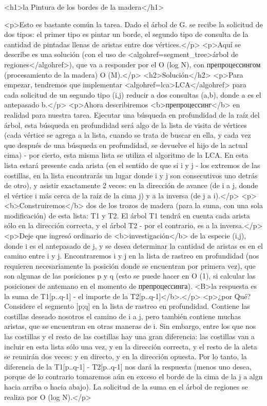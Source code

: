 <h1>la Pintura de los bordes de la madera</h1>

<p>Esto es bastante común la tarea. Dado el árbol de G. se recibe la solicitud de dos tipos: el primer tipo es pintar un borde, el segundo tipo de consulta de la cantidad de pintadas llenas de aristas entre dos vértices.</p>
<p>Aquí se describe es una solución (con el uso de <algohref=segment_tree>árbol de regiones</algohref>), que va a responder por el O (log N), con препроцессингом (procesamiento de la madera) O (M).</p>
<h2>Solución</h2>
<p>Para empezar, tendremos que implementar <algohref=lca>LCA</algohref> para cada solicitud de un segundo tipo (i,j) reducir a dos consultas (a,b), donde a es el antepasado b.</p>
<p>Ahora describiremos <b>препроцессинг</b> en realidad para nuestra tarea. Ejecutar una búsqueda en profundidad de la raíz del árbol, esta búsqueda en profundidad será algo de la lista de visita de vértices (cada vértice se agrega a la lista, cuando se trata de buscar en ella, y cada vez que después de una búsqueda en profundidad, se devuelve el hijo de la actual cima) - por cierto, esta misma lista se utiliza el algoritmo de la LCA. En esta lista estará presente cada arista (en el sentido de que si i y j - los extremos de las costillas, en la lista encontrarás un lugar donde i y j son consecutivos uno detrás de otro), y asistir exactamente 2 veces: en la dirección de avance (de i a j, donde el vértice i más cerca de la raíz de la cima j) y a la inversa (de j a i).</p>
<p><b>Construiremos</b> dos de los trozos de madera (para la suma, con una sola modificación) de esta lista: T1 y T2. El árbol T1 tendrá en cuenta cada arista sólo en la dirección correcta, y el árbol T2 - por el contrario, es a la inversa.</p>
<p>Deje que ingresó ordinario de <b>investigación</b> de la especie (i,j), donde i es el antepasado de j, y se desea determinar la cantidad de aristas es en el camino entre i y j. Encontraremos i y j en la lista de rastreo en profundidad (nos requieren necesariamente la posición donde se encuentran por primera vez), que son algunas de las posiciones p y q (esto se puede hacer en O (1), si calcular las posiciones de antemano en el momento de препроцессинга). <B>la respuesta es la suma de T1[p..q-1] - el importe de la T2[p..q-1]</b>.</p>
<p>¿por Qué? Considere el segmento [p;q] en la lista de rastreo en profundidad. Contiene las costillas deseado nosotros el camino de i a j, pero también contiene muchas aristas, que se encuentran en otras maneras de i. Sin embargo, entre los que nos las costillas y el resto de las costillas hay una gran diferencia: las costillas van a incluir en esta lista sólo una vez, y en la dirección correcta, y el resto de la aleta se reunirán dos veces: y en directo, y en la dirección opuesta. Por lo tanto, la diferencia de la T1[p..q-1] - T2[p..q-1] nos dará la respuesta (menos uno desea, porque de lo contrario tomaremos aún en exceso el borde de la cima de la j a algn hacia arriba o hacia abajo). La solicitud de la suma en el árbol de regiones se realiza por O (log N).</p>
